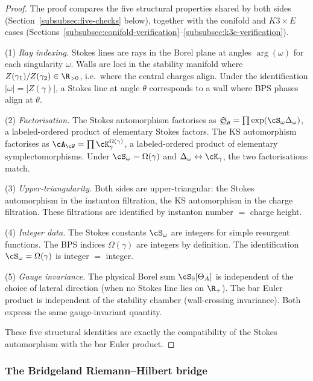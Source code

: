 \begin{proof}
The proof compares the five structural properties shared by both sides (Section~\ref{subsubsec:five-checks} below), together with the conifold and $K3 \times E$ cases (Sections~\ref{subsubsec:conifold-verification}--\ref{subsubsec:k3e-verification}).

\smallskip
\noindent(1) \emph{Ray indexing.} Stokes lines are rays in the Borel plane at angles $\arg(\omega)$ for each singularity $\omega$. Walls are loci in the stability manifold where $Z(\gamma_1)/Z(\gamma_2) \in \R_{>0}$, i.e.\ where the central charges align. Under the identification $|\omega| = |Z(\gamma)|$, a Stokes line at angle $\theta$ corresponds to a wall where BPS phases align at $\theta$.

\smallskip
\noindent(2) \emph{Factorisation.} The Stokes automorphism factorises as $\underline{\mathfrak{S}}_\theta = \prod \exp(\cS_\omega \Delta_\omega)$, a labeled-ordered product of elementary Stokes factors. The KS automorphism factorises as $\cA_\cW = \prod \cK_\gamma^{\Omega(\gamma)}$, a labeled-ordered product of elementary symplectomorphisms. Under $\cS_\omega = \Omega(\gamma)$ and $\Delta_\omega \leftrightarrow \cK_\gamma$, the two factorisations match.

\smallskip
\noindent(3) \emph{Upper-triangularity.} Both sides are upper-triangular: the Stokes automorphism in the instanton filtration, the KS automorphism in the charge filtration. These filtrations are identified by instanton number $=$ charge height.

\smallskip
\noindent(4) \emph{Integer data.} The Stokes constants $\cS_\omega$ are integers for simple resurgent functions. The BPS indices $\Omega(\gamma)$ are integers by definition. The identification $\cS_\omega = \Omega(\gamma)$ is integer $=$ integer.

\smallskip
\noindent(5) \emph{Gauge invariance.} The physical Borel sum $\cS_0[\Theta_A]$ is independent of the choice of lateral direction (when no Stokes line lies on $\R_+$). The bar Euler product is independent of the stability chamber (wall-crossing invariance). Both express the same gauge-invariant quantity.

\medskip\noindent These five structural identities are exactly the compatibility of the Stokes automorphism with the bar Euler product.
\end{proof}

\subsubsection{The Bridgeland Riemann--Hilbert bridge}
\label{subsubsec:bridgeland-rh}
%

